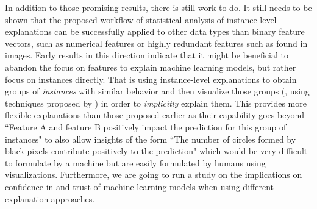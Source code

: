 In addition to those promising results, there is still work to do.
It still needs to be shown that the proposed workflow of statistical analysis of instance-level explanations can be successfully applied to other data types than binary feature vectors, such as numerical features or highly redundant features such as found in images.
Early results in this direction indicate that it might be beneficial to abandon the focus on features to explain machine learning models, but rather focus on instances directly.
That is using instance-level explanations to obtain groups of \emph{instances} with similar behavior and then visualize those groups (\eg, using techniques proposed by \cite{seekaview}) in order to \emph{implicitly} explain them.
This provides more flexible explanations than those proposed earlier as their capability goes beyond ``Feature A and feature B positively impact the prediction for this group of instances" to also allow insights of the form ``The number of circles formed by black pixels contribute positively to the prediction" which would be very difficult to formulate by a machine but are easily formulated by humans using visualizations.
Furthermore, we are going to run a study on the implications on confidence in and trust of machine learning models when using different explanation approaches.



% 


